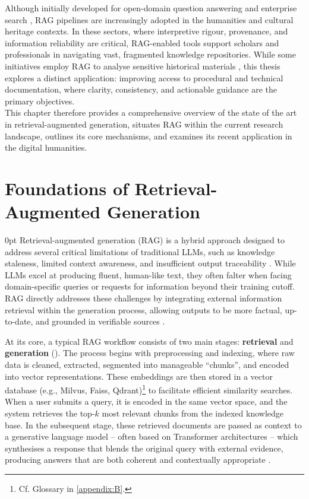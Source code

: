 \begin{spacing}{1.5}
Although initially developed for open-domain question answering and enterprise search \parencite{akkiraju_facts_2024, jiang_towards_2024, packowski_optimizing_2024, yang_ragva_2025, zhou_enabling_2025}, RAG pipelines are increasingly adopted in the humanities and cultural heritage contexts. In these sectors, where interpretive rigour, provenance, and information reliability are critical, RAG-enabled tools support scholars and professionals in navigating vast, fragmented knowledge repositories. While some initiatives employ RAG to analyse sensitive historical materials \citep{callaghan_prototyping_2025, ciletti_retrieval-augmented_2025, sergeev_talking_2025, fan_research_2025}, this thesis explores a distinct application: improving access to procedural and technical documentation, where clarity, consistency, and actionable guidance are the primary objectives.
\\

This chapter therefore provides a comprehensive overview of the state of the art in retrieval-augmented generation, situates RAG within the current research landscape, outlines its core mechanisms, and examines its recent application in the digital humanities.

\section{Foundations of Retrieval-Augmented Generation}\setlength{\parskip}
{0pt}
Retrieval-augmented generation (RAG) is a hybrid approach designed to address several critical limitations of traditional LLMs, such as knowledge staleness, limited context awareness, and insufficient output traceability \parencite{vaibhav_retrieval-augmented_2025,gao_retrieval-augmented_2024, gupta_comprehensive_2024}. While LLMs excel at producing fluent, human-like text, they often falter when facing domain-specific queries or requests for information beyond their training cutoff. RAG directly addresses these challenges by integrating external information retrieval within the generation process, allowing outputs to be more factual, up-to-date, and grounded in verifiable sources \citep{wang_searching_2024}.

At its core, a typical RAG workflow consists of two main stages: \textbf{retrieval} and \textbf{generation} (\cite{odsc-community_retrieval-augmented_2024}). The process begins with preprocessing and indexing, where raw data is cleaned, extracted, segmented into manageable ``chunks'', and encoded into vector representations. These embeddings are then stored in a vector database (e.g., Milvus, Faiss, Qdrant)\footnote{Cf. Glossary in \autoref{appendix:B}.} to facilitate efficient similarity searches. When a user submits a query, it is encoded in the same vector space, and the system retrieves the top-$k$ most relevant chunks from the indexed knowledge base. In the subsequent stage, these retrieved documents are passed as context to a generative language model -- often based on Transformer architectures \citep{vaswani_attention_2017} -- which synthesises a response that blends the original query with external evidence, producing answers that are both coherent and contextually appropriate \citep{arslan_survey_2024}.


\end{spacing}
